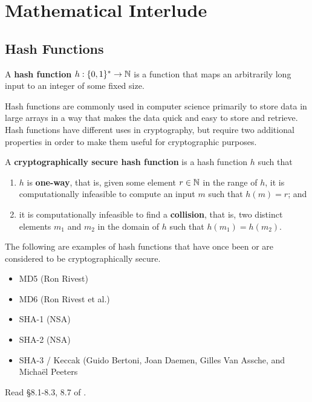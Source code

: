 \chapter{Mathematical Interlude}
\label{ch:math}
	\section{Hash Functions}

\begin{definition}
A {\bf hash function}  $h:\{0,1\}^* \to \mathbb{N}$ is a function that maps an arbitrarily long input to an integer of some fixed size.
\end{definition}

Hash functions are commonly used in computer science primarily to store data in large arrays in a way that makes the data quick and easy to store and retrieve. Hash functions have different uses in cryptography, but require two additional properties in order to make them useful for cryptographic purposes.

\begin{definition}
A {\bf cryptographically secure hash function} is a hash function $h$ such that
\begin{enumerate}
\item $h$ is {\bf one-way}, that is, given some element $r\in\mathbb{N}$ in the range of $h$, it is computationally infeasible to compute an input $m$ such that $h(m)=r$; and
\item it is computationally infeasible to find a {\bf collision}, that is, two distinct elements $m_1$ and $m_2$ in the domain of $h$ such that $h(m_1) = h(m_2)$.
\end{enumerate}
\end{definition}

The following are examples of hash functions that have once been or are considered to be cryptographically secure.

	\begin{itemize}
		\item MD5 (Ron Rivest)
		\item MD6 (Ron Rivest et al.)
		\item SHA-1 (NSA)
		\item SHA-2 (NSA)
		\item SHA-3 / Keccak (Guido Bertoni, Joan Daemen, Gilles Van Assche, and Micha\"{e}l Peeters
	\end{itemize}

	Read \S 8.1-8.3, 8.7 of \cite{tw}.

